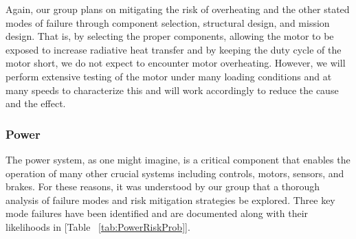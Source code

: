 Again, our group plans on mitigating the risk of overheating and the other stated modes of failure through component selection, structural design, and mission design. That is, by selecting the proper components, allowing the motor to be exposed to increase radiative heat transfer and by keeping the duty cycle of the motor short, we do not expect to encounter motor overheating. However, we will perform extensive testing of the motor under many loading conditions and at many speeds to characterize this and will work accordingly to reduce the cause and the effect. 


\subsubsection{Power\label{sss:PowerRisk}}

\indent\indent The power system, as one might imagine, is a critical component that enables the operation of many other crucial systems including controls, motors, sensors, and brakes. For these reasons, it was understood by our group that a thorough analysis of failure modes and risk mitigation strategies be explored. Three key mode failures have been identified and are documented along with their likelihoods in [Table ~\ref{tab:PowerRiskProb}].

\begin{table}[H]
\caption{\label{tab:PowerRiskProb} Power System Failure Modes \& Probabilities}
\centering

\end{table}

